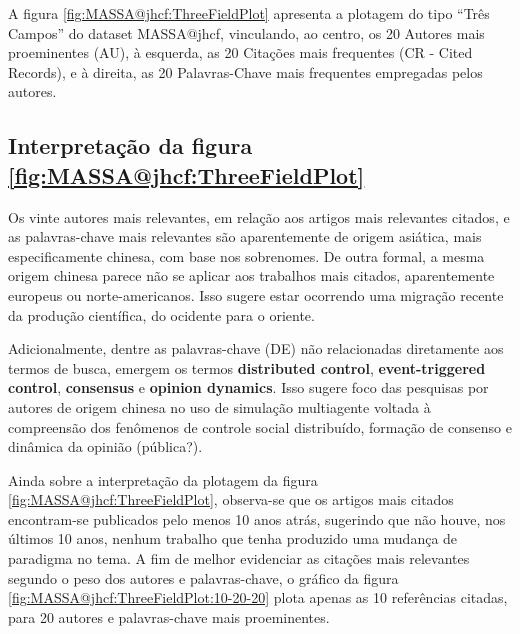 A figura \ref{fig:MASSA@jhcf:ThreeFieldPlot} apresenta a plotagem do tipo ``Três Campos'' do dataset MASSA@jhcf, vinculando, ao centro, os 20 Autores mais proeminentes (AU), à esquerda, as 20 Citações mais frequentes (CR - Cited Records), e à direita, as 20 Palavras-Chave mais frequentes empregadas pelos autores.

\subsection{Interpretação da figura \ref{fig:MASSA@jhcf:ThreeFieldPlot}}
Os vinte autores mais relevantes, em relação aos artigos mais relevantes citados, e as palavras-chave mais relevantes são aparentemente de origem asiática, mais especificamente chinesa, com base nos sobrenomes. De outra formal, a mesma origem chinesa parece não se aplicar aos trabalhos mais citados, aparentemente europeus ou norte-americanos. Isso sugere estar ocorrendo uma migração recente da produção científica, do ocidente para o oriente. 

Adicionalmente, dentre as palavras-chave (DE) não relacionadas diretamente aos termos de busca, emergem os termos \textbf{distributed control}, \textbf{event-triggered control}, \textbf{consensus} e \textbf{opinion dynamics}. Isso sugere foco das pesquisas por autores de origem chinesa no uso de simulação multiagente voltada à compreensão dos fenômenos de controle social distribuído, formação de consenso e dinâmica da opinião (pública?).

Ainda sobre a interpretação da plotagem da figura \ref{fig:MASSA@jhcf:ThreeFieldPlot}, observa-se que os artigos mais citados encontram-se publicados pelo menos 10 anos atrás, sugerindo que não houve, nos últimos 10 anos, nenhum trabalho que tenha produzido uma mudança de paradigma no tema.
A fim de melhor evidenciar as citações mais relevantes segundo o peso dos autores e palavras-chave, o gráfico da figura \ref{fig:MASSA@jhcf:ThreeFieldPlot:10-20-20} plota apenas as 10 referências citadas, para 20 autores e palavras-chave mais proeminentes.

